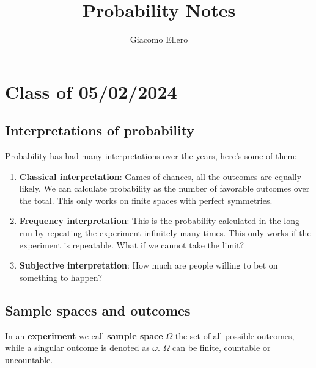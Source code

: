 \documentclass[10pt]{extarticle}
\title{Probability Notes}
\author{Giacomo Ellero}
\begin{document}
\maketitle
\tableofcontents
\clearpage

\section{Class of 05/02/2024}

\subsection{Interpretations of probability}

Probability has had many interpretations over the years, here's some of them:
\begin{enumerate}
    \item \textbf{Classical interpretation}: Games of chances, all the outcomes are equally likely.
          We can calculate probability as the number of favorable outcomes over the total.
          This only works on finite spaces with perfect symmetries.
    \item \textbf{Frequency interpretation}: This is the probability calculated in the long run by repeating the experiment infinitely many times.
          This only works if the experiment is repeatable. What if we cannot take the limit?
    \item \textbf{Subjective interpretation}: How much are people willing to bet on something to happen?
\end{enumerate}

\subsection{Sample spaces and outcomes}

In an \textbf{experiment} we call \textbf{sample space} $\Omega$ the set of all possible outcomes,
while a singular outcome is denoted as $\omega$.
$\Omega$ can be finite, countable or uncountable.
\end{document}
